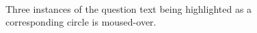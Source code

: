 \documentclass[12pt,twoside,notitlepage,xetex]{report}
\begin{document}
\begin{center}
\begin{figure}[H]
\begin{center}
\\
\vspace{0.5cm}
\end{center}
\caption{Three instances of the question text being highlighted as a corresponding circle is moused-over.}
\label{fig:Highlighting}
\end{figure}
\end{center}
\end{document}
